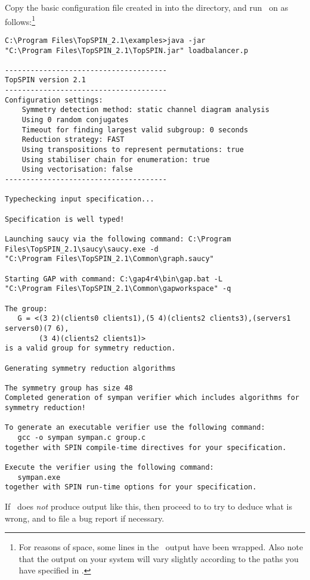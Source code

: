 Copy the basic configuration file created in
 into the  directory,
and run \topspin\ on  as
follows:\footnote{For reasons of space, some lines in the \topspin\
output have been wrapped. Also note that the output on your system
will vary slightly according to the paths you have specified in
.}
%
\begin{lstlisting}
C:\Program Files\TopSPIN_2.1\examples>java -jar
"C:\Program Files\TopSPIN_2.1\TopSPIN.jar" loadbalancer.p

--------------------------------------
TopSPIN version 2.1
--------------------------------------
Configuration settings:
    Symmetry detection method: static channel diagram analysis
    Using 0 random conjugates
    Timeout for finding largest valid subgroup: 0 seconds
    Reduction strategy: FAST
    Using transpositions to represent permutations: true
    Using stabiliser chain for enumeration: true
    Using vectorisation: false
--------------------------------------

Typechecking input specification...

Specification is well typed!

Launching saucy via the following command: C:\Program Files\TopSPIN_2.1\saucy\saucy.exe -d
"C:\Program Files\TopSPIN_2.1\Common\graph.saucy"

Starting GAP with command: C:\gap4r4\bin\gap.bat -L
"C:\Program Files\TopSPIN_2.1\Common\gapworkspace" -q

The group:
   G = <(3 2)(clients0 clients1),(5 4)(clients2 clients3),(servers1 servers0)(7 6),
        (3 4)(clients2 clients1)>
is a valid group for symmetry reduction.

Generating symmetry reduction algorithms

The symmetry group has size 48
Completed generation of sympan verifier which includes algorithms for symmetry reduction!

To generate an executable verifier use the following command:
   gcc -o sympan sympan.c group.c
together with SPIN compile-time directives for your specification.

Execute the verifier using the following command:
   sympan.exe
together with SPIN run-time options for your specification.
\end{lstlisting}
%
If \topspin\ does \emph{not} produce output like this, then proceed
to \chapref{troubleshooting} to try to deduce what is wrong, and to
file a bug report if necessary.

